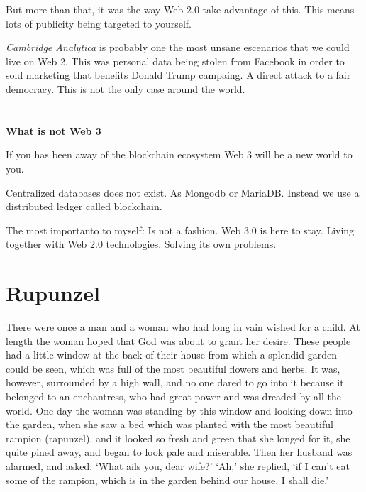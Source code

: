 \documentclass[oneside,11pt]{memoir} %
\begin{document}
But more than that, it was the way Web 2.0 take advantage of this. This means lots of publicity being targeted to yourself.

\textit{Cambridge Analytica} is probably one the most unsane escenarios that we could live on Web 2. This was personal data being stolen from Facebook in order to sold marketing that benefits Donald Trump campaing. A direct attack to a fair democracy. This is not the only case around the world.




\chapter{}
\textbf{What is not Web 3}

If you has been away of the blockchain ecosystem Web 3 will be a new world to you.

Centralized databases does not exist. As Mongodb or MariaDB. Instead we use a distributed ledger called blockchain. 

The most importanto to myself: Is not a fashion. Web 3.0 is here to stay. Living together with Web 2.0 technologies. Solving its own problems.



\chapter{Rupunzel}

There were once a man and a woman who had long in vain wished for a child. At length the woman hoped that God was about to grant her desire. These people had a little window at the back of their house from which a splendid garden could be seen, which was full of the most beautiful flowers and herbs. It was, however, surrounded by a high wall, and no one dared to go into it because it belonged to an enchantress, who had great power and was dreaded by all the world. One day the woman was standing by this window and looking down into the garden, when she saw a bed which was planted with the most beautiful rampion (rapunzel), and it looked so fresh and green that she longed for it, she quite pined away, and began to look pale and miserable. Then her husband was alarmed, and asked: `What ails you, dear wife?' `Ah,' she replied, `if I can't eat some of the rampion, which is in the garden behind our house, I shall die.' 
\end{document}
